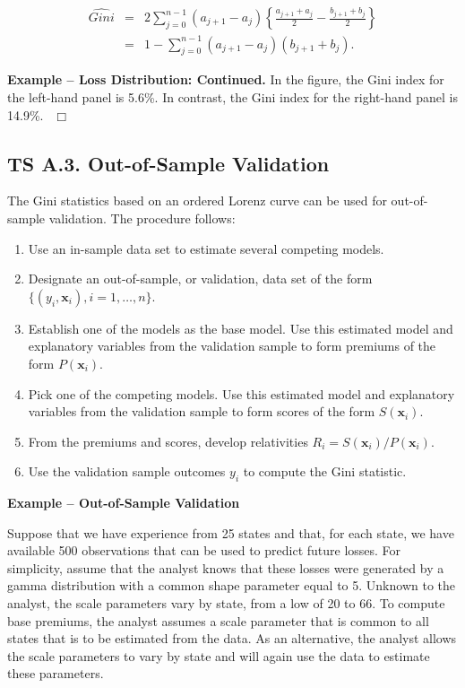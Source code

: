 \documentclass[]{book}
\providecommand{\tightlist}{%
  \setlength{\itemsep}{0pt}\setlength{\parskip}{0pt}}
\theoremstyle{definition}
\theoremstyle{definition}
\theoremstyle{definition}
\theoremstyle{remark}
\begin{document}
\begin{eqnarray}
\widehat{Gini} &=&  2\sum_{j=0}^{n-1} (a_{j+1} - a_j) \left \{
\frac{a_{j+1}+a_j}{2} - \frac{b_{j+1}+b_j}{2} \right\} \nonumber \\
&=& 1 - \sum_{j=0}^{n-1} (a_{j+1} - a_j) (b_{j+1}+b_j) .\label{eq:GiniDefn}
\end{eqnarray}

\textbf{Example -- Loss Distribution: Continued.} In the figure, the
Gini index for the left-hand panel is 5.6\%. In contrast, the Gini index
for the right-hand panel is 14.9\%. \(~~\Box\)

\subsection*{TS A.3. Out-of-Sample
Validation}\label{ts-a.3.-out-of-sample-validation}

The Gini statistics based on an ordered Lorenz curve can be used for
out-of-sample validation. The procedure follows:

\begin{enumerate}
\def\labelenumi{\arabic{enumi}.}
\tightlist
\item
  Use an in-sample data set to estimate several competing models.
\item
  Designate an out-of-sample, or validation, data set of the form
  \(\{(y_i, \mathbf{x}_i), i=1,\ldots,n\}\).
\item
  Establish one of the models as the base model. Use this estimated
  model and explanatory variables from the validation sample to form
  premiums of the form \(P(\mathbf{x}_i)\).
\item
  Pick one of the competing models. Use this estimated model and
  explanatory variables from the validation sample to form scores of the
  form \(S(\mathbf{x}_i)\).
\item
  From the premiums and scores, develop relativities
  \(R_i =S(\mathbf{x}_i)/P(\mathbf{x}_i)\).
\item
  Use the validation sample outcomes \(y_i\) to compute the Gini
  statistic.
\end{enumerate}

\textbf{Example -- Out-of-Sample Validation}

Suppose that we have experience from 25 states and that, for each state,
we have available 500 observations that can be used to predict future
losses. For simplicity, assume that the analyst knows that these losses
were generated by a gamma distribution with a common shape parameter
equal to 5. Unknown to the analyst, the scale parameters vary by state,
from a low of 20 to 66. To compute base premiums, the analyst assumes a
scale parameter that is common to all states that is to be estimated
from the data. As an alternative, the analyst allows the scale
parameters to vary by state and will again use the data to estimate
these parameters.
\end{document}
